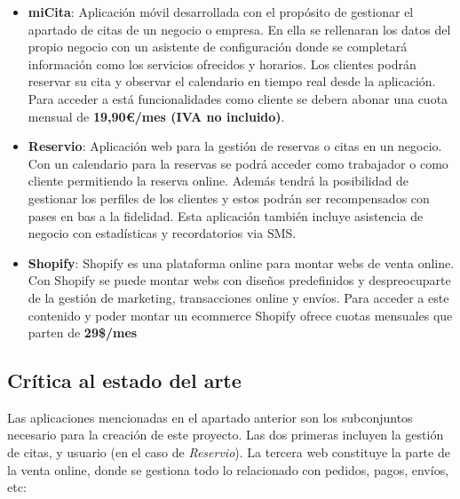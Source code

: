 \vspace{-0.5em}
\begin{itemize}
    \item \textbf{miCita}: Aplicación móvil desarrollada con el propósito de gestionar el apartado de citas de un
    negocio o empresa. En ella se rellenaran los datos del propio negocio con un asistente de configuración donde
    se completará información como los servicios ofrecidos y horarios. Los clientes podrán reservar su cita y
    observar el calendario en tiempo real desde la aplicación. Para acceder a está funcionalidades como cliente
    se debera abonar una cuota mensual de \textbf{19,90\euro/mes (IVA no incluido)}.\cite{micita}

    \item \textbf{Reservio}: Aplicación web para la gestión de reservas o citas en un negocio.
    Con un calendario para la reservas se podrá acceder como trabajador o como cliente permitiendo la reserva online.
    Además tendrá la posibilidad de gestionar los perfiles de los clientes  y estos podrán ser recompensados
    con pases en bas a la fidelidad. Esta aplicación también incluye asistencia de negocio con estadísticas y
    recordatorios via SMS.\cite{reservio}

    \item \textbf{Shopify}: Shopify es una plataforma online para montar webs de venta online. Con Shopify se puede
    montar webs con diseños predefinidos y despreocuparte de la gestión de marketing, transacciones online
    y envíos. Para acceder a este contenido y poder montar un ecommerce Shopify ofrece cuotas mensuales que parten de
    \textbf{29\$/mes}\cite{shopify}
\end{itemize}

\subsection{Crítica al estado del arte}

Las aplicaciones mencionadas en el apartado anterior son los subconjuntos necesario para la creación de este proyecto.
Las dos primeras incluyen la gestión de citas, y usuario (en el caso de \textit{Reservio}). La tercera web constituye
la parte de la venta online, donde se gestiona todo lo relacionado con pedidos, pagos, envíos, etc:

\vspace{-0.5em}


